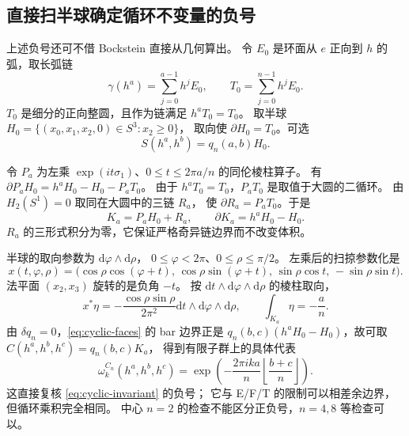 \documentclass[UTF8,11pt,fontset=none]{ctexart}
\numberwithin{equation}{section}
\theoremstyle{definition}
\newcommand{\dd}{\mathrm d}
\begin{document}
\subsection{直接扫半球确定循环不变量的负号}

上述负号还可不借 Bockstein 直接从几何算出。
令 $E_0$ 是环面从 $e$ 正向到 $h$ 的弧，取长弧链
\[
 \gamma(h^a)=\sum_{j=0}^{a-1}h^jE_0,\qquad
 T_0=\sum_{j=0}^{n-1}h^jE_0.
\]
$T_0$ 是细分的正向整圆，且作为链满足 $h^aT_0=T_0$。
取半球
$H_0=\{(x_0,x_1,x_2,0)\in S^3:x_2\ge0\}$，
取向使 $\partial H_0=T_0$。可选
\begin{equation}
 S(h^a,h^b)=q_n(a,b)H_0.
 \label{eq:cyclic-faces}
\end{equation}

令 $P_a$ 为左乘 $\exp(it\sigma_1)$、$0\le t\le2\pi a/n$ 的同伦棱柱算子。
有
$\partial P_aH_0=h^aH_0-H_0-P_aT_0$。
由于 $h^aT_0=T_0$，$P_aT_0$ 是取值于大圆的二循环。
由 $H_2(S^1)=0$ 取同在大圆中的三链 $R_a$，
使 $\partial R_a=P_aT_0$。于是
\begin{equation}
 K_a=P_aH_0+R_a,\qquad \partial K_a=h^aH_0-H_0.
 \label{eq:cyclic-sweep-chain}
\end{equation}
$R_a$ 的三形式积分为零，它保证严格奇异链边界而不改变体积。

半球的取向参数为 $\dd\varphi\wedge\dd\rho$，
$0\le\varphi<2\pi$、$0\le\rho\le\pi/2$。
左乘后的扫掠参数化是
\begin{equation}
 x(t,\varphi,\rho)=
 \big(\cos\rho\cos(\varphi+t),\,
      \cos\rho\sin(\varphi+t),\,
      \sin\rho\cos t,\,-\sin\rho\sin t\big).
 \label{eq:cyclic-sweep}
\end{equation}
法平面 $(x_2,x_3)$ 旋转的是负角 $-t$。
按 $\dd t\wedge\dd\varphi\wedge\dd\rho$ 的棱柱取向，
\begin{equation}
 x^*\eta=-\frac{\cos\rho\sin\rho}{2\pi^2}
 \dd t\wedge\dd\varphi\wedge\dd\rho,
 \qquad \int_{K_a}\eta=-\frac an.
 \label{eq:cyclic-volume-sign}
\end{equation}
由 $\delta q_n=0$，\eqref{eq:cyclic-faces} 的 bar 边界正是
$q_n(b,c)(h^aH_0-H_0)$，故可取 $C(h^a,h^b,h^c)=q_n(b,c)K_a$，
得到有限子群上的具体代表
\begin{equation}
 \omega_k^{C_n}(h^a,h^b,h^c)
 =\exp\left(-\frac{2\pi ika}{n}
       \left\lfloor\frac{b+c}{n}\right\rfloor\right).
 \label{eq:cyclic-representative}
\end{equation}
这直接复核 \eqref{eq:cyclic-invariant} 的负号；
它与 E/F/T 的限制可以相差余边界，但循环乘积完全相同。
中心 $n=2$ 的检查不能区分正负号，$n=4,8$ 等检查可以。
\end{document}
